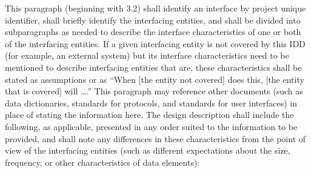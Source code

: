 \documentclass{fidata-report-template}
\begin{document}
This paragraph (beginning with 3.2) shall identify an interface by
project unique identifier, shall briefly identify the interfacing
entities, and shall be divided into subparagraphs as needed to describe
the interface characteristics of one or both of the interfacing
entities. If a given interfacing entity is not covered by this IDD (for
example, an external system) but its interface characteristics need to
be mentioned to describe interfacing entities that are, these
characteristics shall be stated as assumptions or as ``When {[}the
entity not covered{]} does this, {[}the entity that is covered{]} will
\ldots{}.'' This paragraph may reference other documents (such as data
dictionaries, standards for protocols, and standards for user
interfaces) in place of stating the information here. The design
description shall include the following, as applicable, presented in any
order suited to the information to be provided, and shall note any
differences in these characteristics from the point of view of the
interfacing entities (such as different expectations about the size,
frequency, or other characteristics of data elements):
\end{document}
